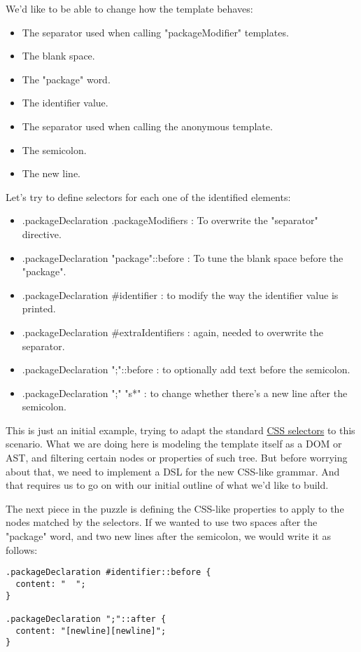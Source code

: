 \documentclass[11pt]{article}
\begin{document}
We'd like to be able to change how the template behaves:
\begin{itemize}
\item The separator used when calling "packageModifier" templates.
\item The blank space.
\item The "package" word.
\item The identifier value.
\item The separator used when calling the anonymous template.
\item The semicolon.
\item The new line.
\end{itemize}

Let's try to define selectors for each one of the identified elements:
\begin{itemize}
\item .packageDeclaration .packageModifiers : To overwrite the "separator" directive.
\item .packageDeclaration "package"::before : To tune the blank space before the "package".
\item .packageDeclaration \#identifier : to modify the way the identifier value is printed.
\item .packageDeclaration \#extraIdentifiers : again, needed to overwrite the separator.
\item .packageDeclaration ";"::before : to optionally add text before the semicolon.
\item .packageDeclaration ";" "s*" : to change whether there's a new line after the semicolon.
\end{itemize}

This is just an initial example, trying to adapt the standard \href{http://www.w3.org/TR/2011/REC-css3-selectors-20110929/}{CSS selectors} to this scenario. What we are doing here is
modeling the template itself as a DOM or AST, and filtering certain nodes or properties of such tree. But before worrying
about that, we need to implement a DSL for the new CSS-like grammar. And that requires us to go on with our initial
outline of what we'd like to build.

The next piece in the puzzle is defining the CSS-like properties to apply to the nodes matched by the selectors.
If we wanted to use two spaces after the "package" word, and two new lines after the semicolon, we would write it as follows:

\begin{verbatim}
.packageDeclaration #identifier::before {
  content: "  ";
}

.packageDeclaration ";"::after {
  content: "[newline][newline]";
}
\end{verbatim}
\end{document}
